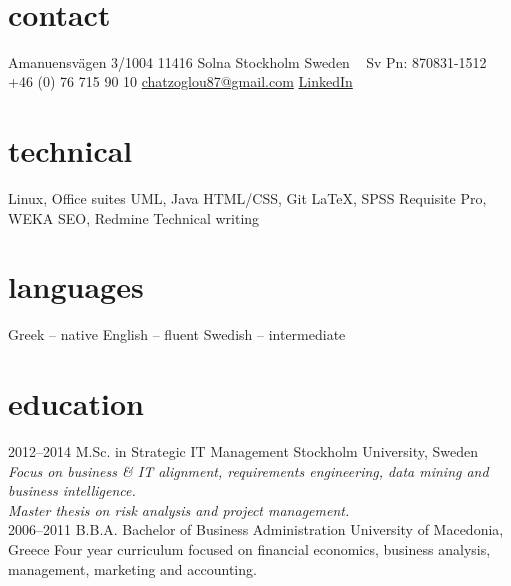 \documentclass[]{thanos-cv}
\begin{document}


\begin{aside}
~
~
~
~
~
~
~
~
~
~
\section{{\color{gray}{\FA \faHome}}contact}
Amanuensvägen 3/1004
11416 Solna
Stockholm
Sweden
~
{\color{orange}{\FA \faUser}}{ Sv Pn: 870831-1512}
~
{\color{green!150}{\FA \faPhone}}{ +46 (0) 76 715 90 10}
{\color{gray}{\FA \faEnvelope}} \href{mailto:chatzoglou87@gmail.com}{chatzoglou87@gmail.com}
{\color{linkedin}{\FA \faLinkedin}} \href{http://lnkd.in/buQYKsf}{LinkedIn}
~

\section{technical}
Linux, Office suites
UML, Java
HTML/CSS, Git
\LaTeX, SPSS
Requisite Pro, WEKA
SEO, Redmine
Technical writing
~

\section{languages}
Greek -- native
English -- fluent
Swedish -- intermediate
\end{aside}
\section{education}

\begin{entrylist}
\entry
{2012--2014}
{M.Sc. {\normalfont in Strategic IT Management}}
{Stockholm University, Sweden}
{\emph{Focus on business \& IT alignment, requirements engineering, data mining and business intelligence.\\
Master thesis on risk analysis and project management.}}\\
\entry
{2006--2011}
{B.B.A. {\normalfont Bachelor of Business Administration}}
{University of Macedonia, Greece}
{Four year curriculum focused on financial economics, business analysis, management, marketing and accounting.}
\end{entrylist}
\end{document}
